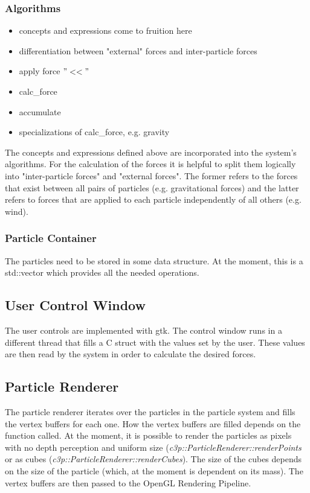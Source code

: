 \documentclass[runningheads,a4paper]{llncs}
\begin{document}
\subsubsection{Algorithms}
\begin{itemize}
\item concepts and expressions come to fruition here
\item differentiation between "external" forces and inter-particle forces
\item apply force $"<<"$
\item calc\_force
\item accumulate
\item specializations of calc\_force, e.g. gravity
\end{itemize}

The concepts and expressions defined above are incorporated into the system's algorithms. For the calculation of the forces it is helpful to split them logically into "inter-particle forces" and "external forces". The former refers to the forces that exist between all pairs of particles (e.g. gravitational forces) and the latter refers to forces that are applied to each particle independently of all others (e.g. wind).



\subsubsection{Particle Container}
The particles need to be stored in some data structure. At the moment, this is a std::vector which provides all the needed operations.

\subsection{User Control Window}
The user controls are implemented with gtk. The control window runs in a different thread that fills a C struct with the values set by the user. These values are then read by the system in order to calculate the desired forces.

\subsection{Particle Renderer}
The particle renderer iterates over the particles in the particle system and fills the vertex buffers for each one. How the vertex buffers are filled depends on the function called. At the moment, it is possible to render the particles as pixels with no depth perception and uniform size (\emph{c3p::ParticleRenderer::renderPoints}
or as cubes (\emph{c3p::ParticleRenderer::renderCubes}). The size of the cubes depends on the size of the particle (which, at the moment is dependent on its mass). The vertex buffers are then passed to the OpenGL Rendering Pipeline.
\end{document}
